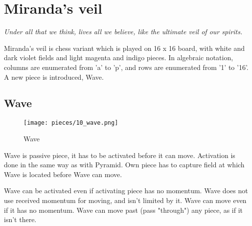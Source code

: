 

\chapter*{Miranda's veil}

\begin{flushright}
\parbox{0.8\textwidth}{
\emph{Under all that we think, lives all we believe, like the ultimate veil of our spirits. \\
 } }
\end{flushright}

\noindent
Miranda's veil is chess variant which is played on 16 x 16 board, with
white and dark violet fields and light magenta and indigo pieces. In
algebraic notation, columns are enumerated from 'a' to 'p', and rows
are enumerated from '1' to '16'. A new piece is introduced, Wave.

\clearpage %

\section*{Wave}

\vspace*{-1.0ex}
\noindent
\begin{wrapfigure}[12]{l}{0.4\textwidth}
\centering
\texttt{[image: pieces/10\_wave.png]}
\caption{Wave}
\label{fig:10_wave}
\end{wrapfigure}
Wave is passive piece, it has to be activated before it can move. Activation
is done in the same way as with Pyramid. Own piece has to capture field at
which Wave is located before Wave can move.

Wave can be activated even if activating piece has no momentum. Wave does not use
received momentum for moving, and isn't limited by it. Wave can move even if it
has no momentum. Wave can move past (pass "through") any piece, as if it isn't there.

